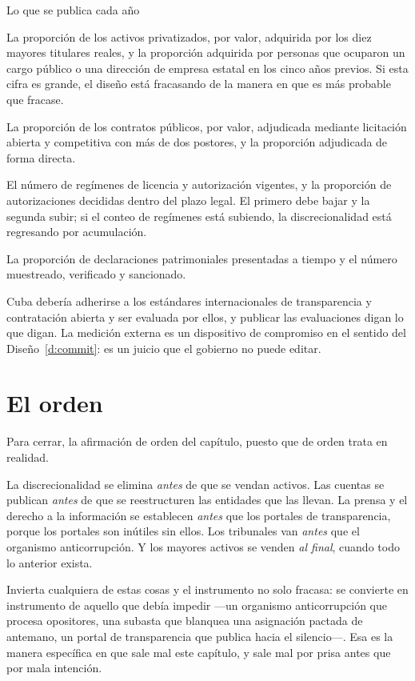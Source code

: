\begin{design}{Lo que se publica cada año}
\label{d:measure}
\begin{rules}
 La proporción de los activos privatizados, por valor, adquirida por los diez
mayores titulares reales, y la proporción adquirida por personas que ocuparon un cargo público o
una dirección de empresa estatal en los cinco años previos. Si esta cifra es grande, el diseño está
fracasando de la manera en que es más probable que fracase.

 La proporción de los contratos públicos, por valor, adjudicada mediante
licitación abierta y competitiva con más de dos postores, y la proporción adjudicada de forma
directa.

 El número de regímenes de licencia y autorización vigentes, y la
proporción de autorizaciones decididas dentro del plazo legal. El primero debe bajar y la segunda
subir; si el conteo de regímenes está subiendo, la discrecionalidad está regresando por
acumulación.

 La proporción de declaraciones patrimoniales presentadas a tiempo y el número
muestreado, verificado y sancionado.

 Cuba debería adherirse a los estándares internacionales de
transparencia y contratación abierta y ser evaluada por ellos, y publicar las evaluaciones digan lo
que digan. La medición externa es un dispositivo de compromiso en el sentido del
Diseño~\ref{d:commit}: es un juicio que el gobierno no puede editar.
\end{rules}
\end{design}

\section{El orden}

Para cerrar, la afirmación de orden del capítulo, puesto que de orden trata en realidad.

La discrecionalidad se elimina \emph{antes} de que se vendan activos. Las cuentas se publican
\emph{antes} de que se reestructuren las entidades que las llevan. La prensa y el derecho a la
información se establecen \emph{antes} que los portales de transparencia, porque los portales son
inútiles sin ellos. Los tribunales van \emph{antes} que el organismo anticorrupción. Y los mayores
activos se venden \emph{al final}, cuando todo lo anterior exista.

Invierta cualquiera de estas cosas y el instrumento no solo fracasa: se convierte en instrumento
de aquello que debía impedir ---un organismo anticorrupción que procesa opositores, una subasta que
blanquea una asignación pactada de antemano, un portal de transparencia que publica hacia el
silencio---. Esa es la manera específica en que sale mal este capítulo, y sale mal por prisa antes
que por mala intención.
